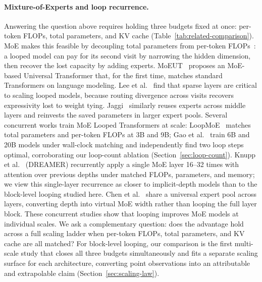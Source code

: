 \documentclass[]{bytedance_seed}
\theoremstyle{definition}
\theoremstyle{remark}
\begin{document}
\paragraph{Mixture-of-Experts and loop recurrence.}
Answering the question above requires holding three budgets fixed at once: per-token FLOPs, total parameters, and KV cache (Table~\ref{tab:related-comparison}).
%
MoE makes this feasible by decoupling total parameters from per-token FLOPs~\cite{shazeer2017outrageously,fedus2022switch}: a looped model can pay for its second visit by narrowing the hidden dimension, then recover the lost capacity by adding experts.
%
MoEUT~\cite{csordas2024moeut} proposes an MoE-based Universal Transformer that, for the first time, matches standard Transformers on language modeling.
%
Lee et al.~\cite{lee2026sparse} find that sparse layers are critical to scaling looped models, because routing divergence across visits recovers expressivity lost to weight tying.
%
Jaggi~\cite{jaggi2026tying} similarly reuses experts across middle layers and reinvests the saved parameters in larger expert pools.
%
Several concurrent works train MoE Looped Transformers at scale: LoopMoE~\cite{chen2026loopmoe} matches total parameters and per-token FLOPs at 3B and 9B; Gao et al.~\cite{gao2026loopie} train 6B and 20B models under wall-clock matching and independently find two loop steps optimal, corroborating our loop-count ablation (Section~\ref{sec:loop-count}).
%
Knupp et al.~\cite{knupp2026dreamer} (DREAMER) recurrently apply a single MoE layer 16--32 times with attention over previous depths under matched FLOPs, parameters, and memory; we view this single-layer recurrence as closer to implicit-depth models than to the block-level looping studied here.
%
Chen et al.~\cite{chen2026moue} share a universal expert pool across layers, converting depth into virtual MoE width rather than looping the full layer block.
%
These concurrent studies show that looping improves MoE models at individual scales.
%
We ask a complementary question: does the advantage hold across a full scaling ladder when per-token FLOPs, total parameters, and KV cache are all matched?
%
For block-level looping, our comparison is the first multi-scale study that closes all three budgets simultaneously and fits a separate scaling surface for each architecture, converting point observations into an attributable and extrapolable claim (Section~\ref{sec:scaling-law}).
%
\end{document}
